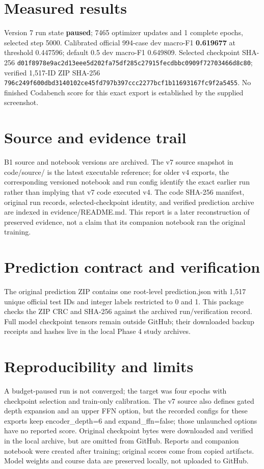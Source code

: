 \documentclass[11pt,a4paper]{article}
\begin{document}
\section{Measured results}
Version 7 run state \textbf{paused}; 7465 optimizer updates and 1 complete epochs, selected step 5000. Calibrated official 994-case dev macro-F1 \textbf{0.619677} at threshold 0.447596; default 0.5 dev macro-F1 0.649809. Selected checkpoint SHA-256 \texttt{d01f8978e9ac2d13eee5d202fa75df285c27915fecdbbc0909f72703466d8c80}; verified 1,517-ID ZIP SHA-256 \texttt{796c249f600dbd3140102ce45fd797b397ccc2277bcf1b11693167fc9f2a5455}. No finished Codabench score for this exact export is established by the supplied screenshot.
\section{Source and evidence trail}
B1 source and notebook versions are archived. The v7 source snapshot in code/source/ is the latest executable reference; for older v4 exports, the corresponding versioned notebook and run config identify the exact earlier run rather than implying that v7 code executed v4. The code SHA-256 manifest, original run records, selected-checkpoint identity, and verified prediction archive are indexed in evidence/README.md. This report is a later reconstruction of preserved evidence, not a claim that its companion notebook ran the original training.
\section{Prediction contract and verification}
The original prediction ZIP contains one root-level prediction.json with 1,517 unique official test IDs and integer labels restricted to 0 and 1. This package checks the ZIP CRC and SHA-256 against the archived run/verification record. Full model checkpoint tensors remain outside GitHub; their downloaded backup receipts and hashes live in the local Phase 4 study archives.
\section{Reproducibility and limits}
A budget-paused run is not converged; the target was four epochs with checkpoint selection and train-only calibration. The v7 source also defines gated depth expansion and an upper FFN option, but the recorded configs for these exports keep encoder\_depth=6 and expand\_ffn=false; those unlaunched options have no reported score. Original checkpoint bytes were downloaded and verified in the local archive, but are omitted from GitHub. Reports and companion notebook were created after training; original scores come from copied artifacts. Model weights and course data are preserved locally, not uploaded to GitHub.
\end{document}
